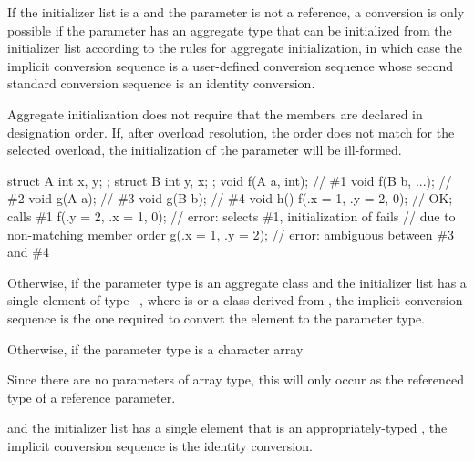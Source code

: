 \pnum
If the initializer list is a 
and the parameter is not a reference,
a conversion is only possible if
the parameter has an aggregate type
that can be initialized from the initializer list
according to the rules for aggregate initialization,
in which case the implicit conversion sequence is
a user-defined conversion sequence
whose second standard conversion sequence
is an identity conversion.
\begin{note}
Aggregate initialization does not require that
the members are declared in designation order.
If, after overload resolution, the order does not match
for the selected overload,
the initialization of the parameter will be ill-formed.
\begin{example}
\begin{codeblock}
struct A { int x, y; };
struct B { int y, x; };
void f(A a, int);               // \#1
void f(B b, ...);               // \#2
void g(A a);                    // \#3
void g(B b);                    // \#4
void h() {
  f({.x = 1, .y = 2}, 0);       // OK; calls \#1
  f({.y = 2, .x = 1}, 0);       // error: selects \#1, initialization of  fails
                                // due to non-matching member order
  g({.x = 1, .y = 2});          // error: ambiguous between \#3 and \#4
}
\end{codeblock}
\end{example}
\end{note}

\pnum
Otherwise,
if the parameter type is an aggregate class  and the initializer list has a
single element of type \cv{}~, where  is 
or a class derived from , the implicit conversion sequence is the one
required to convert the element to the parameter type.

\pnum
Otherwise, if the parameter type is a character array
\begin{footnote}
Since there are no parameters of array type,
this will only occur as the referenced type of a reference parameter.
\end{footnote}
and the initializer list has a single element that is an appropriately-typed
, the implicit conversion
sequence is the identity conversion.

